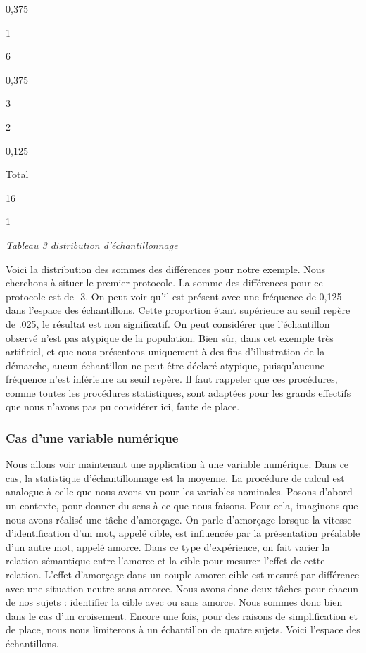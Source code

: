 \documentclass[]{book}
\theoremstyle{definition}
\theoremstyle{definition}
\theoremstyle{definition}
\theoremstyle{remark}
\begin{document}
0,375

1

6

0,375

3

2

0,125

Total

16

1

\emph{Tableau 3 distribution d'échantillonnage}

Voici la distribution des sommes des différences pour notre exemple.
Nous cherchons à situer le premier protocole. La somme des différences
pour ce protocole est de -3. On peut voir qu'il est présent avec une
fréquence de 0,125 dans l'espace des échantillons. Cette proportion
étant supérieure au seuil repère de .025, le résultat est non
significatif. On peut considérer que l'échantillon observé n'est pas
atypique de la population. Bien sûr, dans cet exemple très artificiel,
et que nous présentons uniquement à des fins d'illustration de la
démarche, aucun échantillon ne peut être déclaré atypique, puisqu'aucune
fréquence n'est inférieure au seuil repère. Il faut rappeler que ces
procédures, comme toutes les procédures statistiques, sont adaptées pour
les grands effectifs que nous n'avons pas pu considérer ici, faute de
place.

\hypertarget{cas-dune-variable-numerique}{%
\subsubsection{Cas d'une variable
numérique}\label{cas-dune-variable-numerique}}

Nous allons voir maintenant une application à une variable numérique.
Dans ce cas, la statistique d'échantillonnage est la moyenne. La
procédure de calcul est analogue à celle que nous avons vu pour les
variables nominales. Posons d'abord un contexte, pour donner du sens à
ce que nous faisons. Pour cela, imaginons que nous avons réalisé une
tâche d'amorçage. On parle d'amorçage lorsque la vitesse
d'identification d'un mot, appelé cible, est influencée par la
présentation préalable d'un autre mot, appelé amorce. Dans ce type
d'expérience, on fait varier la relation sémantique entre l'amorce et la
cible pour mesurer l'effet de cette relation. L'effet d'amorçage dans un
couple amorce-cible est mesuré par différence avec une situation neutre
sans amorce. Nous avons donc deux tâches pour chacun de nos sujets :
identifier la cible avec ou sans amorce. Nous sommes donc bien dans le
cas d'un croisement. Encore une fois, pour des raisons de simplification
et de place, nous nous limiterons à un échantillon de quatre sujets.
Voici l'espace des échantillons.
\end{document}
